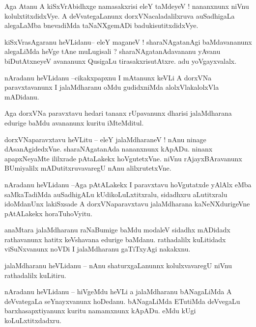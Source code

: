 \documentclass{article}
\begin{document}
\begin{mn}%
Aga Atanu A kiSxVrAbidhxge namasakxrisi eleY taMdeyeV ! nananxnunx niVnu kolulxtitxdidxVye. 
A deVvategaLanunx dorxVNacaladalilxruva auSadhigaLa alegaLaMba bnevadiMda taNaNXgemADi 
badukisutitxdidxVye.
\end{mn}

\begin{mn}%
kiSxVrasAgaranu heVLidanu-- eleY maganeV ! sharaNAgatanAgi baMdavananunx alegaLiMda heVge 
tAne muLugisali ? sharaNAgatanAdavananu yAvanu biDutAtxneyeV avananunx QusigaLu 
tirasakxrisutAtxre. adu yoVgayxvalalx.
\end{mn}

\begin{mn}%
nAradanu heVLidanu --cikakxpapxnu I mAtanunx keVLi A dorxVNa paravxtavanunx I jalaMdharanu 
oMdu gudidxniMda alolxVlakalolxVla mADidanu.
\end{mn}

\begin{mn}%
Aga dorxVNa paravxtavu hedari tananx rUpavanunx dharisi jalaMdharana edurige baMdu avananunx 
kuritu iMteMditul.
\end{mn}

\begin{mn}%
dorxVNaparavxtavu heVLitu -- eleY jalaMdharaneV ! nAnu ninage dAsanAgidedxVne. 
sharaNAgatanAda nananxnunx kApADu. ninanx apapxNeyaMte ililxrade pAtaLakekx hoVgutetxVne. 
niVnu rAjayxBAravanunx BUmiyalilx mADutitxruvavaregU nAnu alilxrutetxVne.
\end{mn}

\begin{mn}%
nAradanu heVLidanu --Aga pAtALakekx I paravxtavu hoVgutatxde yAlAlx eMba saMkaTadiMda 
auSadhigALu kUdikoLuLxtitxralu, sidadhxru aLutitxralu idoMdanUnx lakiSxsade A 
dorxVNaparavxtavu jalaMdharana kaNeNXdurigeVne pAtALakekx horaTuhoVyitu.
\end{mn}

\begin{mn}%
anaMtara jalaMdharanu raNaBumige baMdu modaleV sidadhx mADidadx rathavanunx hatitx 
keVshavana edurige baMdanu. rathadalilx kuLitidadx viSuNxvanunx noVDi I jalaMdharanu 
gaTiTxyAgi nakakxnu.
\end{mn}

\begin{mn}%
jalaMdharanu heVLidanu -- nAnu shaturxgaLanunnx kolulxvavaregU niVnu rathadalilx kuLitiru.
\end{mn}

\begin{mn}%
nAradanu heVLidanu -- hiVgeMdu heVLi a jalaMdharanu bANagaLiMda A deVvategaLa seYnayxvanunx 
hoDedanu. bANagaLiMda ETutiMda deVvegaLu barxhasapxtiyanunx kuritu namamxnunx kApADu. eMdu 
kUgi koLuLxtitxdadxru.
\end{mn}
\end{document}
